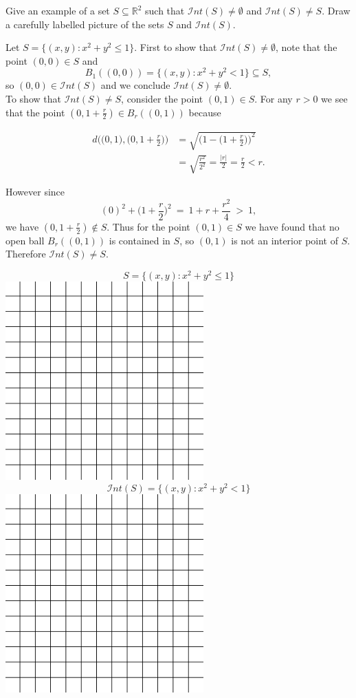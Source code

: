 \documentclass[12pt]{article}
\newcommand{\R}{\mathbb R} %
\newcommand{\ints}{\mathcal{I}nt(S)}
\newenvironment{ppart}[1]{\noindent {\bf (#1) }}{\medskip}
\begin{document}
\begin{ppart}{a} Give an example of a set $S\subseteq \R^2$ such that $\mathcal{I}nt(S)\neq \emptyset$ and $\mathcal{I}nt(S)\neq S$.  Draw a carefully labelled picture of the sets $S$ and $\mathcal{I}nt(S)$. \end{ppart}

Let $S=\{(x,y) : x^2+y^2 \le 1\}.$ First to show that $\ints\ne\emptyset$, note that the point $(0,0)\in S$ and $$B_1((0,0))=\{(x,y): x^2+y^2 < 1\} \subseteq S,$$
so $(0,0) \in\ints$ and we conclude $\ints\ne\emptyset$.\\

To show that $\ints \ne S$, consider the point $(0,1)\in S$. For any $r>0$ we see that the point $(0,1+\frac{r}{2}) \in B_r((0,1))$ because

\begin{align*}
d\bigg( \Big(0,1\Big),\Big(0,1+\frac{r}{2}\Big)\bigg) &= \sqrt{\bigg(1- \Big(1+\frac{r}{2}\Big)\bigg)^2}\\
						&= \sqrt{ \frac{r^2}{2^2} } = \frac{|r|}{2} = \frac{r}{2} < r.
\end{align*}

However since $$(0)^2+\Big(1+\frac{r}{2}\Big)^2 \ =  \ 1 + r + \frac{r^2}{4} \ > \ 1,$$ we have $(0,1+\frac{r}{2}) \notin S$. Thus for the point $(0,1)\in S$ we have found that no open ball $B_r((0,1))$ is contained in $S$, so $(0,1)$ is not an interior point of $S$. Therefore $\ints\ne S$.

\begin{center}$$S=\{(x,y) : x^2+y^2 \le 1\}$$
\includegraphics[width=3in]{grid.png}\\
\newpage
$$\ints = \{(x,y) : x^2+y^2 < 1\}$$
\includegraphics[width=3in]{grid.png}\\\end{center}
\end{document}
